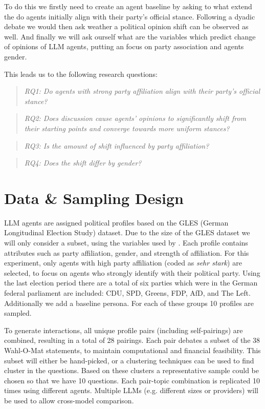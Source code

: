 \documentclass[12pt]{article}
\newcommand{\researchquestion}[1]{\begin{quote}\sloppy \emph{#1} \end{quote}}
\begin{document}
\begin{multicols}{2}
To do this we firstly need to create an agent baseline by asking to what extend the do agents initially align with their party's official stance. Following a dyadic debate we would then ask weather a political opinion shift can be observed as well. And finally we will ask ourself what are the variables which predict change of opinions of LLM agents, putting an focus on party association and agents gender. 

This leads us to the following research questions:
\researchquestion{RQ1: Do agents with strong party affiliation align with their party’s official stance?}
\researchquestion{RQ2: Does discussion cause agents' opinions to significantly shift from their starting points and converge towards more uniform stances?}
\researchquestion{RQ3: Is the amount of shift influenced by party affiliation?}
\researchquestion{RQ4: Does the shift differ by gender?}


\section{Data \& Sampling Design}

LLM agents are assigned political profiles based on the GLES (German Longitudinal Election Study) dataset. Due to the size of the GLES dataset we will only consider a subset, using the variables used by . Each profile contains attributes such as party affiliation, gender, and strength of affiliation. For this experiment, only agents with high party affiliation (coded as \textit{sehr stark}) are selected, to focus on agents who strongly identify with their political party. Using the last election period there are a total of six parties which were in the German federal parliament are included: CDU, SPD, Greens, FDP, AfD, and The Left. Additionally we add a baseline persona. For each of these groups 10 profiles are sampled. 

To generate interactions, all unique profile pairs (including self-pairings) are combined, resulting in a total of 28 pairings. Each pair debates a subset of the 38 Wahl-O-Mat statements, to maintain computational and financial feasibility. This subset will either be hand-picked, or a clustering techniques can be used to find cluster in the questions. Based on these clusters a representative sample could be chosen so that we have 10 questions. Each pair-topic combination is replicated 10 times using different agents. Multiple LLMs (e.g. different sizes or providers) will be used to allow cross-model comparison.

\end{multicols}
\end{document}
